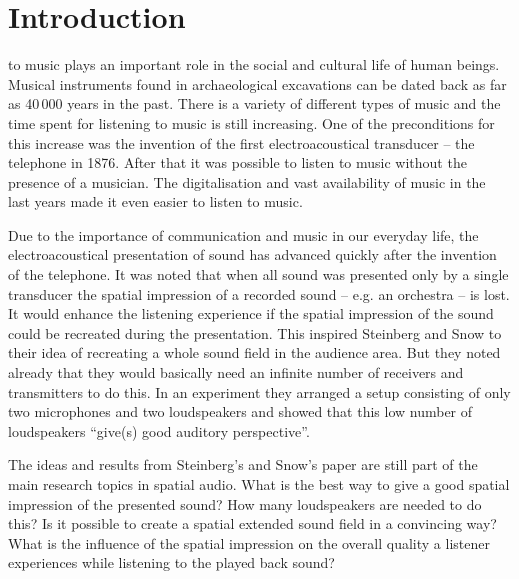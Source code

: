 \def \GITHUB {\GITHUBBASE/01_introduction}
\graphicspath{%
{\PATH/\CHAPONE/}%
{\PATH/\CHAPONE/fig1_01/}%
{\PATH/\CHAPONE/fig1_02/}%
{\PATH/\CHAPONE/fig1_03/}%
{\PATH/\CHAPONE/fig1_04/}%
{\PATH/\CHAPONE/fig1_05/}%
}

\chapter{Introduction}
\label{cha:introduction}
%
 to music plays an important role in the social and
cultural life of human beings.
Musical instruments found in archaeological excavations can be dated back as far
as 40\,000 years in the past.\autocite[For an overview see][]{dErrico2003}
There is a variety of different types of music and the time spent for
listening to music is still increasing. One of the preconditions for this
increase was the invention of the first electroacoustical transducer -- the
telephone in 1876. After that it was possible to listen to music without the
presence of a musician.
The digitalisation and vast availability of music in the last years made it
even easier to listen to music.\autocite{Sloboda2009}

Due to the importance of communication and music in our everyday life, the
electroacoustical presentation of sound has advanced quickly after the invention of
the telephone.
It was noted that when all sound was presented only by a single transducer the
spatial impression of a recorded sound -- e.g. an orchestra -- is lost.
It would enhance the listening experience if the spatial impression of the
sound could be recreated during the presentation. This inspired Steinberg and
Snow\autocite{Steinberg1934} to their idea of recreating a whole sound field in
the audience area. But they noted already that they would basically need an
infinite number of receivers and transmitters to do this.
In an experiment they arranged a setup consisting of only two microphones and
two loudspeakers and showed that this low number of loudspeakers ``give(s) good
auditory perspective''.

The ideas and results from Steinberg's and Snow's paper are still part of the main research
topics in spatial audio. What is the best way to give a good spatial
impression of the presented sound? How many loudspeakers are needed to do this?
Is it possible to create a spatial
extended sound field in a convincing way? What is the influence of the spatial impression on
the overall quality a listener experiences while listening to the played back
sound?

